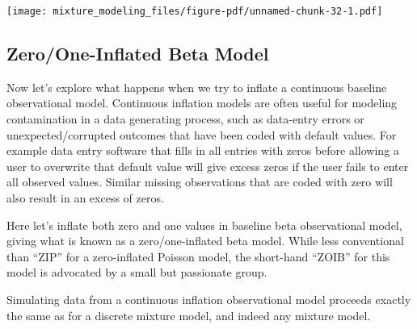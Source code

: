 \documentclass[
  letterpaper,
  DIV=11,
  numbers=noendperiod]{scrartcl}
\begin{document}
\texttt{[image: mixture\_modeling\_files/figure-pdf/unnamed-chunk-32-1.pdf]}

\subsection{Zero/One-Inflated Beta
Model}\label{zeroone-inflated-beta-model}

Now let's explore what happens when we try to inflate a continuous
baseline observational model. Continuous inflation models are often
useful for modeling contamination in a data generating process, such as
data-entry errors or unexpected/corrupted outcomes that have been coded
with default values. For example data entry software that fills in all
entries with zeros before allowing a user to overwrite that default
value will give excess zeros if the user fails to enter all observed
values. Similar missing observations that are coded with zero will also
result in an excess of zeros.

Here let's inflate both zero and one values in baseline beta
observational model, giving what is known as a zero/one-inflated beta
model. While less conventional than ``ZIP'' for a zero-inflated Poisson
model, the short-hand ``ZOIB'' for this model is advocated by a small
but passionate group.

Simulating data from a continuous inflation observational model proceeds
exactly the same as for a discrete mixture model, and indeed any mixture
model.
\end{document}
